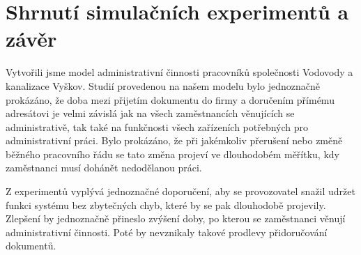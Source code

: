 \documentclass[12pt,a4paper]{article}
\begin{document}
\newpage


\section{Shrnutí simulačních experimentů a závěr}

Vytvořili jsme model administrativní činnosti pracovníků společnosti Vodovody a ka\-na\-li\-za\-ce Vyškov.
Studií provedenou na našem modelu bylo jednoznačně prokázáno, že doba mezi přijetím dokumentu do firmy a doručením přímému adresátovi je velmi závislá jak na všech zaměstnancích věnujících se administrativě, tak také na funkčnosti všech zařízeních potřebných pro administrativní práci. Bylo prokázáno, že při jakémkoliv přerušení nebo změně běžného pracovního řádu se tato změna projeví ve dlouhodobém měřítku, kdy zaměstnanci musí dohánět nedodělanou práci.

Z experimentů vyplývá jednoznačné doporučení, aby se provozovatel snažil udržet funkci systému bez zbytečných chyb, které by se pak dlouhodobě projevily. Zlepšení by jednoznačně přineslo zvýšení doby, po kterou se zaměstnanci věnují administrativní činnosti. Poté by nevznikaly takové prodlevy přidoručování dokumentů.




\newpage
\end{document}
